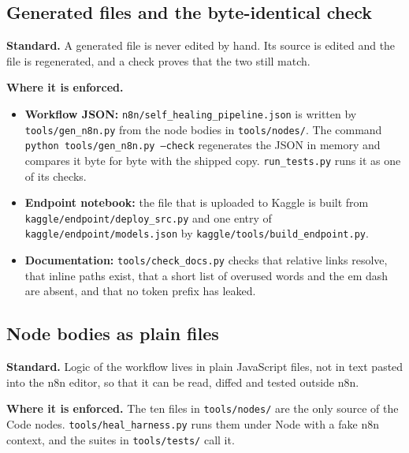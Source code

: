 \subsection{Generated files and the byte-identical check}

\textbf{Standard.} A generated file is never edited by hand. Its source is edited and the file is regenerated, and a check proves that the two still match.

\textbf{Where it is enforced.}
\begin{itemize}
  \item \textbf{Workflow JSON:} \texttt{n8n/\allowbreak{}self\_\allowbreak{}healing\_\allowbreak{}pipeline.json} is written by \texttt{tools/\allowbreak{}gen\_\allowbreak{}n8n.py} from the node bodies in \texttt{tools/\allowbreak{}nodes/\allowbreak{}}. The command \texttt{python tools/gen\_n8n.py --check} regenerates the JSON in memory and compares it byte for byte with the shipped copy. \texttt{run\_\allowbreak{}tests.py} runs it as one of its checks.
  \item \textbf{Endpoint notebook:} the file that is uploaded to Kaggle is built from \texttt{kaggle/\allowbreak{}endpoint/\allowbreak{}deploy\_\allowbreak{}src.py} and one entry of \texttt{kaggle/\allowbreak{}endpoint/\allowbreak{}models.json} by \texttt{kaggle/\allowbreak{}tools/\allowbreak{}build\_\allowbreak{}endpoint.py}.
  \item \textbf{Documentation:} \texttt{tools/\allowbreak{}check\_\allowbreak{}docs.py} checks that relative links resolve, that inline paths exist, that a short list of overused words and the em dash are absent, and that no token prefix has leaked.
\end{itemize}

\subsection{Node bodies as plain files}

\textbf{Standard.} Logic of the workflow lives in plain JavaScript files, not in text pasted into the n8n editor, so that it can be read, diffed and tested outside n8n.

\textbf{Where it is enforced.} The ten files in \texttt{tools/\allowbreak{}nodes/\allowbreak{}} are the only source of the Code nodes. \texttt{tools/\allowbreak{}heal\_\allowbreak{}harness.py} runs them under Node with a fake n8n context, and the suites in \texttt{tools/\allowbreak{}tests/\allowbreak{}} call it.

